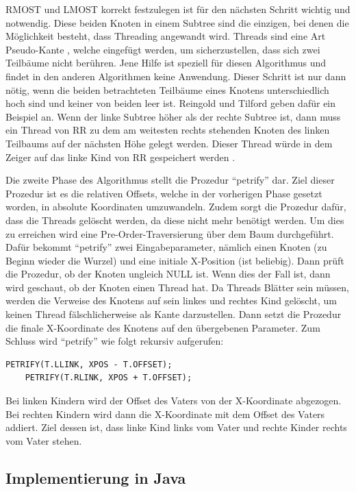 RMOST und LMOST korrekt festzulegen ist für den nächsten Schritt wichtig und notwendig. Diese beiden Knoten in einem Subtree 
sind die einzigen, bei denen die Möglichkeit besteht, dass Threading angewandt wird. Threads sind eine Art \glqq Pseudo-Kante \grqq{}, 
welche eingefügt werden, um sicherzustellen, dass sich zwei Teilbäume nicht berühren. Jene Hilfe ist speziell für diesen Algorithmus
und findet in den anderen Algorithmen keine Anwendung. Dieser Schritt ist nur dann nötig, wenn 
die beiden betrachteten Teilbäume eines Knotens unterschiedlich hoch sind und keiner von beiden leer ist. Reingold und Tilford 
geben dafür ein Beispiel an. Wenn der linke Subtree höher als der rechte Subtree ist, dann muss ein Thread von \ac{RR} zu dem am weitesten 
rechts stehenden Knoten des linken Teilbaums auf der nächsten Höhe gelegt werden. Dieser Thread würde in dem Zeiger auf das linke Kind 
von \ac{RR} gespeichert werden \cite[S.226]{q2}.

Die zweite Phase des Algorithmus stellt die Prozedur “petrify” dar. Ziel dieser Prozedur ist es die relativen Offsets, 
welche in der vorherigen Phase gesetzt worden, in absolute Koordinaten umzuwandeln. Zudem sorgt die Prozedur dafür, dass die Threads 
gelöscht werden, da diese nicht mehr benötigt werden. Um dies zu erreichen wird eine Pre-Order-Traversierung 
über dem Baum durchgeführt. Dafür bekommt “petrify” zwei Eingabeparameter, nämlich einen Knoten (zu Beginn wieder die Wurzel) und eine 
initiale X-Position (ist beliebig). Dann prüft die Prozedur, ob der Knoten ungleich NULL ist. Wenn dies der Fall ist, dann wird geschaut, 
ob der Knoten einen Thread hat. Da Threads Blätter sein müssen, werden die Verweise des Knotens auf sein linkes und rechtes Kind gelöscht, 
um keinen Thread fälschlicherweise als Kante darzustellen. Dann setzt die Prozedur die finale X-Koordinate des Knotens auf den 
übergebenen Parameter. Zum Schluss wird “petrify” wie folgt rekursiv aufgerufen:

\begin{lstlisting}[caption=Rekursiver Aufruf von Petrify (Pre-Order)]
    PETRIFY(T.LLINK, XPOS - T.OFFSET);
    PETRIFY(T.RLINK, XPOS + T.OFFSET);
\end{lstlisting}

Bei linken Kindern wird der Offset des Vaters von der X-Koordinate abgezogen. Bei rechten Kindern wird dann die X-Koordinate mit dem 
Offset des Vaters addiert. Ziel dessen ist, dass linke Kind links vom Vater und rechte Kinder rechts vom Vater stehen.


\subsection{Implementierung in Java}

